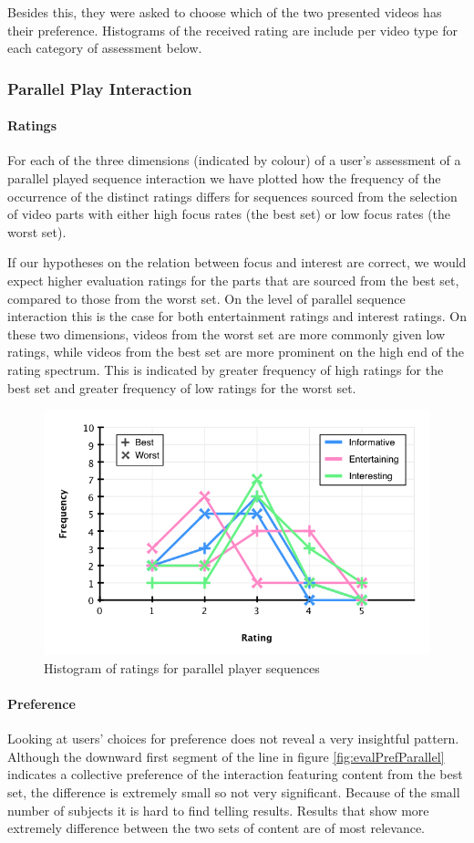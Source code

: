 Besides this, they were asked to choose which of the two presented videos has their preference. Histograms of the received rating are include per video type for each category of assessment below.

\subsubsection{Parallel Play Interaction}
\paragraph{Ratings}

For each of the three dimensions (indicated by colour) of a user's assessment of a parallel played sequence interaction we have plotted how the frequency of the occurrence of the distinct ratings differs for sequences sourced from the selection of video parts with either high focus rates (the best set) or low focus rates (the worst set).

If our hypotheses on the relation between focus and interest are correct, we would expect higher evaluation ratings for the parts that are sourced from the best set, compared to those from the worst set. On the level of parallel sequence interaction this is the case for both entertainment ratings and interest ratings. On these two dimensions, videos from the worst set are more commonly given low ratings, while videos from the best set are more prominent on the high end of the rating spectrum. This is indicated by greater frequency of high ratings for the best set and greater frequency of low ratings for the worst set.

\begin{figure}[htbp]
  \centering
    \includegraphics[width=.6\textwidth]{img/evaluation/hist_parallel_key}
  \caption{Histogram of ratings for parallel player sequences}
  \label{fig:evalParallel}
\end{figure}

\paragraph{Preference}
Looking at users' choices for preference does not reveal a very insightful pattern. Although the downward first segment of the line in figure \ref{fig:evalPrefParallel} indicates a collective preference of the interaction featuring content from the best set, the difference is extremely small so not very significant. Because of the small number of subjects it is hard to find telling results. Results that show more extremely difference between the two sets of content are of most relevance.

